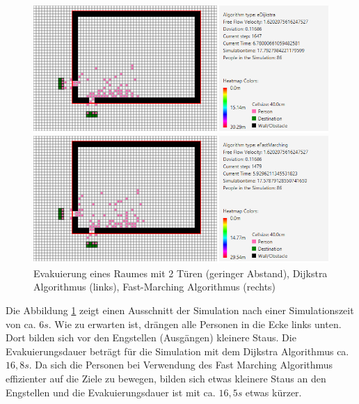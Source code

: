 \begin{figure}[!htb]
	\centering
	\begin{minipage}{.5\textwidth}
		\centering
		\includegraphics[width=\textwidth]{abbildungen/Evak1DMitte.PNG}
	\end{minipage}%
	\begin{minipage}{0.5\textwidth}
		\centering
		\includegraphics[width=\textwidth]{abbildungen/Evak1FMMitte.PNG}
	\end{minipage}
	\caption{Evakuierung eines Raumes mit 2 Türen (geringer Abstand), Dijkstra Algorithmus (links), Fast-Marching Algorithmus (rechts)}
	\label{fig:Evak2TNebeneinanderMinDijkstraFM}
\end{figure}

Die Abbildung \ref{fig:Evak2TNebeneinanderMinDijkstraFM} zeigt einen Ausschnitt der Simulation nach einer Simulationszeit von ca. $6s$. Wie zu erwarten ist, drängen alle Personen in die Ecke links unten. Dort bilden sich vor den Engstellen (Ausgängen) kleinere Staus. Die Evakuierungsdauer beträgt für die Simulation mit dem Dijkstra Algorithmus ca. $16,8s$. Da sich die Personen bei Verwendung des Fast Marching Algorithmus effizienter auf die Ziele zu bewegen, bilden sich etwas kleinere Staus an den Engstellen und die Evakuierungsdauer ist mit ca. $16,5s$ etwas kürzer.

